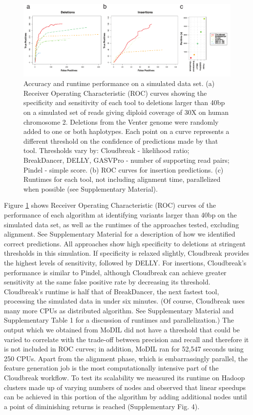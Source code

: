\documentclass{bioinfo}
\newcommand{\todo}[1]{}
\begin{document}
\begin{figure}[!tpb]
\centering
\includegraphics[width=1\textwidth]{chr2_rocs_runtimes_journal.pdf}
\caption{Accuracy and runtime performance on a simulated data set. (a) Receiver Operating Characteristic (ROC) curves showing the specificity and sensitivity of each tool to deletions larger than 40bp on a simulated set of reads giving diploid coverage of 30X on human chromosome 2. Deletions from the Venter genome were randomly added to one or both haplotypes. Each point on a curve represents a different threshold on the confidence of predictions made by that tool. Thresholds vary by: Cloudbreak - likelihood ratio; BreakDancer, DELLY, GASVPro - number of supporting read pairs; Pindel - simple score. (b) ROC curves for insertion predictions. (c) Runtimes for each tool, not including alignment time, parallelized when possible (see Supplementary Material).}
\label{chr2CombinedRoc}
\end{figure}

Figure \ref{chr2CombinedRoc} shows Receiver Operating Characteristic (ROC) curves of the performance of each algorithm at identifying variants larger than 40bp on the simulated data set, as well as the runtimes of the approaches tested, excluding alignment. See Supplementary Material for a description of how we identified correct predictions. All approaches show high specificity to deletions at stringent thresholds in this simulation. If specificity is relaxed slightly, Cloudbreak provides the highest levels of sensitivity, followed by DELLY. For insertions, Cloudbreak's performance is similar to Pindel, although Cloudbreak can achieve greater sensitivity at the same false positive rate by decreasing its threshold. Cloudbreak's runtime is half that of BreakDancer, the next fastest tool, processing the simulated data in under six minutes. (Of course, Cloudbreak uses many more CPUs as distributed algorithm. See Supplementary Material and Supplementary Table 1 for a discussion of runtimes and parallelization.) The output which we obtained from MoDIL did not have a threshold that could be varied to correlate with the trade-off between precision and recall and therefore it is not included in ROC curves; in addition, MoDIL ran for 52,547 seconds using 250 CPUs. Apart from the alignment phase, which is embarrassingly parallel, the feature generation job is the most computationally intensive part of the Cloudbreak workflow. To test its scalability we measured its runtime on Hadoop clusters made up of varying numbers of nodes and observed that linear speedups can be achieved in this portion of the algorithm by adding additional nodes until a point of diminishing returns is reached (Supplementary Fig. 4\todo{\ref{Sscalability}}).
\end{document}
